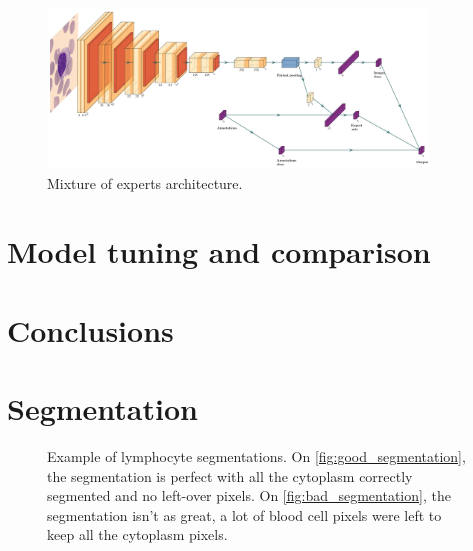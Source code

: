 \documentclass{midl}
\begin{document}
\begin{figure}[h]
    \centering
    \includegraphics[width=0.9\textwidth]{figures/moe.png}
    \caption{Mixture of experts architecture.}
    \label{fig:mixture_of_experts}
\end{figure}

\section{Model tuning and comparison}
\label{sec:evaluation}

\section{Conclusions}
\label{sec:conclusion}

\newpage


\appendix

\section{Segmentation}

\begin{figure}[H]
    \centering
    {
         \qquad
    }
    {\caption{Example of lymphocyte segmentations. On \ref{fig:good_segmentation}, the segmentation is perfect with all the cytoplasm correctly segmented and no left-over pixels. On \ref{fig:bad_segmentation}, the segmentation isn't as great, a lot of blood cell pixels were left to keep all the cytoplasm pixels.\label{fig:segmentation}}}
\end{figure}
\end{document}
